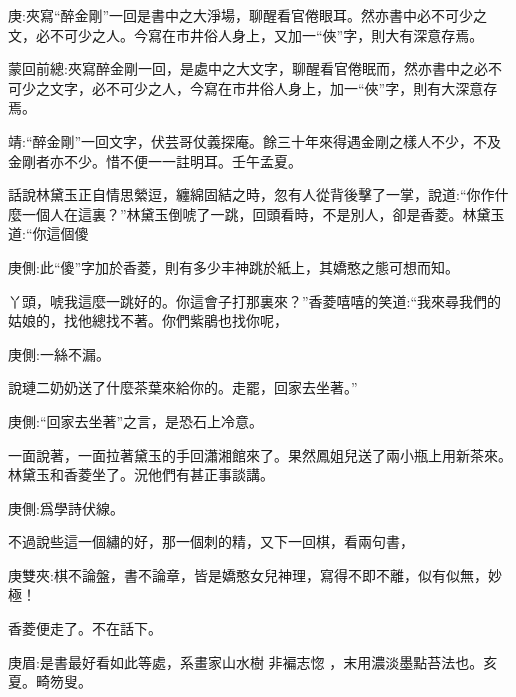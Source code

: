 

\begin{parag}
    \begin{note}庚:夾寫“醉金剛”一回是書中之大淨場，聊醒看官倦眼耳。然亦書中必不可少之文，必不可少之人。今寫在市井俗人身上，又加一“俠”字，則大有深意存焉。\end{note}
\end{parag}


\begin{parag}
    \begin{note}蒙回前總:夾寫醉金剛一回，是處中之大文字，聊醒看官倦眠而，然亦書中之必不可少之文字，必不可少之人，今寫在市井俗人身上，加一“俠”字，則有大深意存焉。\end{note}
\end{parag}


\begin{parag}
    \begin{note}靖:“醉金剛”一回文字，伏芸哥仗義探庵。餘三十年來得遇金剛之樣人不少，不及金剛者亦不少。惜不便一一註明耳。壬午孟夏。\end{note}
\end{parag}


\begin{parag}
    話說林黛玉正自情思縈逗，纏綿固結之時，忽有人從背後擊了一掌，說道:“你作什麼一個人在這裏？”林黛玉倒唬了一跳，回頭看時，不是別人，卻是香菱。林黛玉道:“你這個傻\begin{note}庚側:此“傻”字加於香菱，則有多少丰神跳於紙上，其嬌憨之態可想而知。\end{note}丫頭，唬我這麼一跳好的。你這會子打那裏來？”香菱嘻嘻的笑道:“我來尋我們的姑娘的，找他總找不著。你們紫鵑也找你呢，\begin{note}庚側:一絲不漏。\end{note}說璉二奶奶送了什麼茶葉來給你的。走罷，回家去坐著。”\begin{note}庚側:“回家去坐著”之言，是恐石上冷意。\end{note}一面說著，一面拉著黛玉的手回瀟湘館來了。果然鳳姐兒送了兩小瓶上用新茶來。林黛玉和香菱坐了。況他們有甚正事談講。\begin{note}庚側:爲學詩伏線。\end{note}不過說些這一個繡的好，那一個刺的精，又下一回棋，看兩句書，\begin{note}庚雙夾:棋不論盤，書不論章，皆是嬌憨女兒神理，寫得不即不離，似有似無，妙極！\end{note}香菱便走了。不在話下。\begin{note}庚眉:是書最好看如此等處，系畫家山水樹 非褊志惚 ，末用濃淡墨點苔法也。亥夏。畸笏叟。\end{note}
\end{parag}


